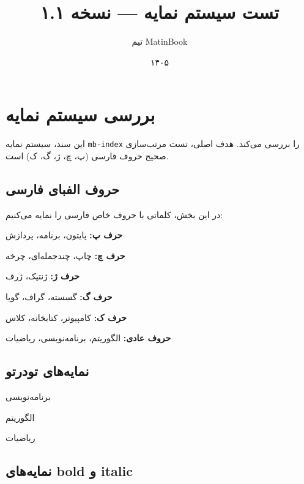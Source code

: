 \documentclass{matinbook}
\title{تست سیستم نمایه — نسخه ۱.۱}
\author{تیم MatinBook}
\date{۱۴۰۵}
\begin{document}
\maketitle

\tableofcontents

\chapter{بررسی سیستم نمایه}
\label{chap:test-index}

این سند، سیستم نمایه \texttt{mb-index} را بررسی می‌کند.
هدف اصلی، تست مرتب‌سازی صحیح حروف فارسی (پ، چ، ژ، گ، ک) است.

\section{حروف الفبای فارسی}
\label{sec:persian-letters}

در این بخش، کلماتی با حروف خاص فارسی را نمایه می‌کنیم:

\textbf{حرف پ:}
پایتون، برنامه، پردازش

\textbf{حرف چ:}
چاپ، چندجمله‌ای، چرخه

\textbf{حرف ژ:}
ژنتیک، ژرف

\textbf{حرف گ:}
گسسته، گراف، گویا

\textbf{حرف ک:}
کامپیوتر، کتابخانه، کلاس

\textbf{حروف عادی:}
الگوریتم، برنامه‌نویسی، ریاضیات

\section{نمایه‌های تودرتو}
\label{sec:nested-index}

برنامه‌نویسی

الگوریتم

ریاضیات

\section{نمایه‌های bold و italic}
\label{sec:bold-italic}
\end{document}
